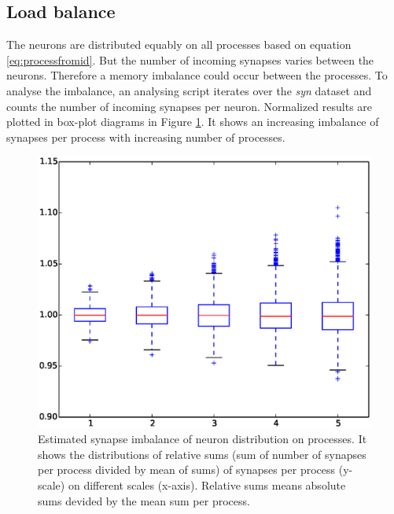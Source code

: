 \subsection{Load balance}
The neurons are distributed equably on all processes based on equation \ref{eq:processfromid}.
But the number of incoming synapses varies between the neurons.
Therefore a memory imbalance could occur between the processes.
To analyse the imbalance, an analysing script iterates over the \emph{syn} dataset and counts
the number of incoming synapses per neuron. Normalized results are plotted in box-plot diagrams 
in Figure \ref{fullcircuitdist}.
It shows an increasing imbalance of synapses per process with increasing number of processes.
\begin{figure}[ht!]
\centering
\includegraphics[scale=0.4]{pictures/full_circuit_rack_distribution.eps}
\caption{Estimated synapse imbalance of neuron distribution on processes.
It shows the distributions of relative sums (sum of number of synapses per process divided by mean of sums) of synapses per process (y-scale) on different scales (x-axis). Relative sums means absolute sums devided by the mean sum per process. }
\label{fullcircuitdist}
\end{figure}

